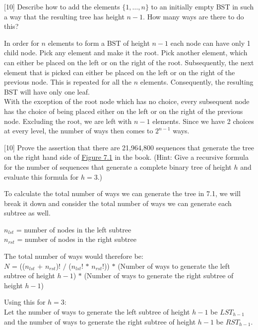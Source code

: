 \documentclass[addpoints]{exam}
\begin{document}
\begin{questions}
  [10]
  Describe how to add the elements $\{1,\ldots,n\}$ to an initially empty BST in such a way that the resulting tree has height $n-1$. How many ways are there to do this?
  \begin{solution}
    In order for $n$ elements to form a BST of height $n-1$ each node can have only 1 child node. Pick any element and make it the root. Pick another element, which can either be placed on the left or on the right of the root. Subsequently, the next element that is picked can either be placed on the left or on the right of the previous node. This is repeated for all the $n$ elements. Consequently, the resulting BST will have only one leaf.\\
    With the exception of the root node which has no choice, every subsequent node has the choice of being placed either on the left or on the right of the previous node. Excluding the root, we are left with $n-1$ elements. Since we have 2 choices at every level, the number of ways then comes to $2^{n-1}$ ways.
  \end{solution}

  [10]
  Prove the assertion that there are 21,964,800 sequences that generate the tree on the right hand side of \href{http://opendatastructures.org/ods-python/7_1_Random_Binary_Search_Tr.html#fig:rbs-lvc}{Figure 7.1} in the book. (Hint: Give a recursive formula for the number of sequences that generate a complete binary tree of height $h$ and evaluate this formula for $h = 3$.)
  \begin{solution}
    To calculate the total number of ways we can generate the tree in 7.1, we will break it down and consider the total number of ways we can generate each subtree as well.
    
    $n_{lst}$ = number of nodes in the left subtree\\
    $n_{rst}$ = number of nodes in the right subtree
    
    The total number of ways would therefore be:\\
    $N$ = (($n_{lst}$ $+$ $n_{rst}$)! $/$ ($n_{lst}$! $*$ $n_{rst}$!)) $*$ (Number of ways to generate the left subtree of height $h-1$) $*$ (Number of ways to generate the right subtree of height $h-1$)
    
    Using this for $h=3$:\\
    Let the number of ways to generate the left subtree of height $h-1$ be $LST_{h-1}$ and the number of ways to generate the right subtree of height $h-1$ be $RST_{h-1}$.
    

\end{solution}
\end{questions}
\end{document}

